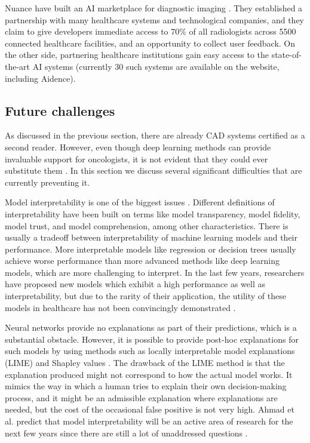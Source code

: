 \documentclass[12pt]{article}
\begin{document}
Nuance have built an AI marketplace for diagnostic imaging \citep{nuance}. They established a partnership with many healthcare systems and technological companies, and they claim to give developers immediate access to 70$\%$ of all radiologists across 5500 connected healthcare facilities, and an opportunity to collect user feedback. On the other side, partnering healthcare institutions gain easy access to the state-of-the-art AI systems (currently 30 such systems are available on the website, including Aidence). 



\subsection{Future challenges} 
As discussed in the previous section, there are already CAD systems certified as a second reader. However, even though deep learning methods can provide invaluable support for oncologists, it is not evident that they could ever substitute them \citep{bakator2018deep}. In this section we discuss several significant difficulties that are currently preventing it.

Model interpretability is one of the biggest issues \citep{ahmad2018interpretable}. Different definitions of interpretability have been built on terms like model transparency, model fidelity, model trust, and model comprehension, among other characteristics. There is usually a tradeoff between interpretability of machine learning models and their performance. More interpretable models like regression or decision trees usually achieve worse performance than more advanced methods like deep learning models, which are more challenging to interpret. In the last few years, researchers have proposed new models which exhibit a high performance as well as interpretability, but due to the rarity of their application, the utility of these models in healthcare has not been convincingly demonstrated \citep{ahmad2018interpretable}.

Neural networks provide no explanations as part of their predictions, which is a substantial obstacle. However, it is possible to provide post-hoc explanations for such models by using methods such as locally interpretable model explanations (LIME) \citep{ribeiro2016should} and Shapley values \citep{vstrumbelj2014explaining}. The drawback of the LIME method is that the explanation produced might not correspond to how the actual model works. It mimics the way in which a human tries to explain their own decision-making process, and it might be an admissible explanation where explanations are needed, but the cost of the occasional false positive is not very high. Ahmad et al. predict that model interpretability will be an active area of research for the next few years since there are still a lot of unaddressed questions \citep{ahmad2018interpretable}.
\end{document}
